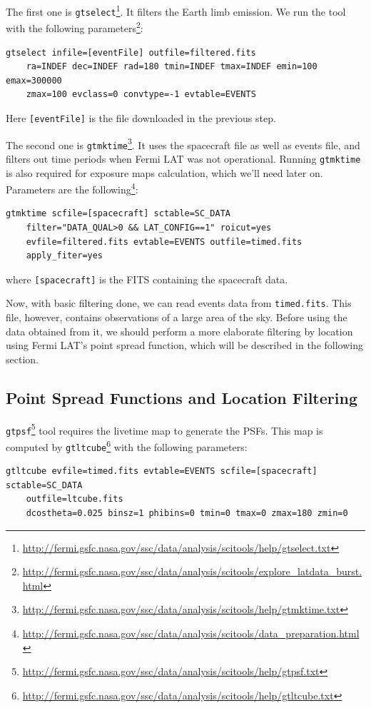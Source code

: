 \documentclass{article}
\begin{document}
The first one is \texttt{gtselect}\footnote{\url{http://fermi.gsfc.nasa.gov/ssc/data/analysis/scitools/help/gtselect.txt}}. It filters the Earth limb emission. We run the tool with the following parameters\footnote{\url{http://fermi.gsfc.nasa.gov/ssc/data/analysis/scitools/explore_latdata_burst.html}}:
\begin{lstlisting}
gtselect infile=[eventFile] outfile=filtered.fits
	ra=INDEF dec=INDEF rad=180 tmin=INDEF tmax=INDEF emin=100 emax=300000
	zmax=100 evclass=0 convtype=-1 evtable=EVENTS
\end{lstlisting}
Here \texttt{[eventFile]} is the file downloaded in the previous step.

The second one is \texttt{gtmktime}\footnote{\url{http://fermi.gsfc.nasa.gov/ssc/data/analysis/scitools/help/gtmktime.txt}}. It uses the spacecraft file as well as events file, and filters out time periods when Fermi LAT was not operational. Running \texttt{gtmktime} is also required for exposure maps calculation, which we'll need later on. Parameters are the following\footnote{\url{http://fermi.gsfc.nasa.gov/ssc/data/analysis/scitools/data_preparation.html}}:
\begin{lstlisting}
gtmktime scfile=[spacecraft] sctable=SC_DATA
	filter="DATA_QUAL>0 && LAT_CONFIG==1" roicut=yes
	evfile=filtered.fits evtable=EVENTS outfile=timed.fits
	apply_fiter=yes
\end{lstlisting}
where \texttt{[spacecraft]} is the FITS containing the spacecraft data.

Now, with basic filtering done, we can read events data from \texttt{timed.fits}. This file, however, contains observations of a large area of the sky. Before using the data obtained from it, we should perform a more elaborate filtering by location using Fermi LAT's point spread function, which will be described in the following section.

\subsection{Point Spread Functions and Location Filtering}

\texttt{gtpsf}\footnote{\url{http://fermi.gsfc.nasa.gov/ssc/data/analysis/scitools/help/gtpsf.txt}} tool requires the livetime map to generate the PSFs. This map is computed by \texttt{gtltcube}\footnote{\url{http://fermi.gsfc.nasa.gov/ssc/data/analysis/scitools/help/gtltcube.txt}} with the following parameters:
\begin{lstlisting}
gtltcube evfile=timed.fits evtable=EVENTS scfile=[spacecraft] sctable=SC_DATA
	outfile=ltcube.fits
	dcostheta=0.025 binsz=1 phibins=0 tmin=0 tmax=0 zmax=180 zmin=0
\end{lstlisting}
\end{document}
